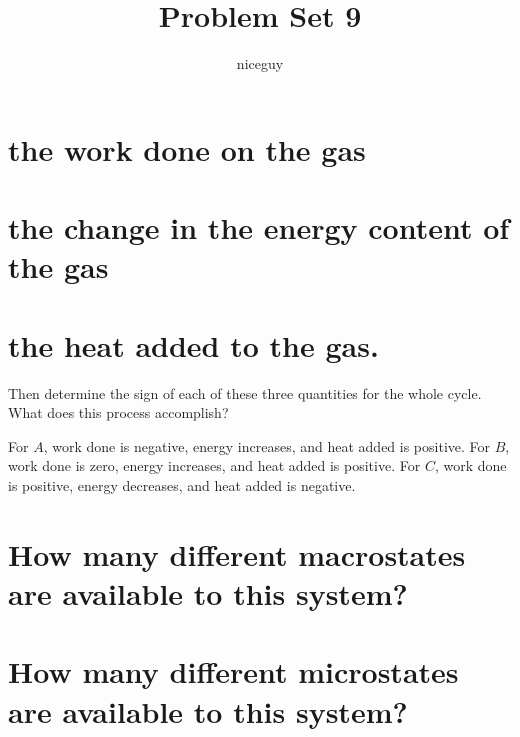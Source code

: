 \documentclass[answers]{exam}
\author{niceguy}
\title{Problem Set 9}
\begin{document}
\maketitle

\begin{questions}


\begin{parts}
    \part{the work done on the gas}
    \part{the change in the energy content of the gas}
    \part{the heat added to the gas.}
\end{parts}

Then determine the sign of each of these three quantities for the whole cycle. What does this process accomplish?

\begin{solution}
    For $A$, work done is negative, energy increases, and heat added is positive. For $B$, work done is zero, energy increases, and heat added is positive. For $C$, work done is positive, energy decreases, and heat added is negative.
\end{solution}


\begin{parts}
    \part{How many different macrostates are available to this system?}
    \part{How many different microstates are available to this system?}

\end{parts}
\end{questions}
\end{document}
